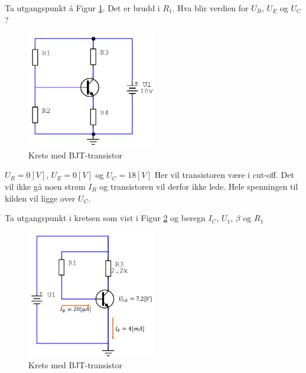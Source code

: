 \begin{question}[name=Oppgave, topic=transBJT]
Ta utgangspunkt å Figur \ref{fig:tranBJT7}. Det er brudd i $R_1$. Hva blir verdien for $U_B$, $U_E$ og $U_C$?

	\begin{figure}[H]
		\centering
		\includegraphics[width=0.5\textwidth]{transistor-BJT/figurer/krets7.png}
		\caption{Krets med BJT-transistor}
		\label{fig:tranBJT7}
	\end{figure}

\end{question}

\vspace{0.5cm} %

\begin{solution}[name=Løsningsforslag oppgave]
	$U_B=0[V]$, $U_E=0[V]$ og $U_C=18[V]$
	Her vil transistoren være i cut-off. Det vil ikke gå noen strøm $I_B$ og transistoren vil derfor ikke lede. Hele spenningen til kilden vil ligge over $U_C$.

\end{solution}




\begin{question}[name=Oppgave, topic=transBJT]
Ta utgangspunkt i kretsen som vist i Figur \ref{fig:tranBJT8} og beregn $I_C$, $U_1$, $\beta$ og $R_1$

	\begin{figure}[H]
		\centering
		\includegraphics[width=0.5\textwidth]{transistor-BJT/figurer/krets8.png}
		\caption{Krets med BJT-transistor}
		\label{fig:tranBJT8}
	\end{figure}

\end{question}

